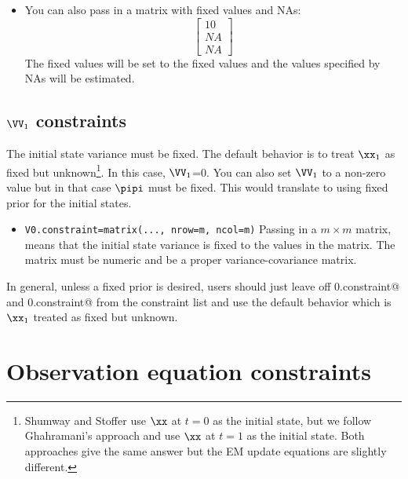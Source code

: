 \begin{itemize}
\item[] You can also pass in a matrix with fixed values and NAs: 
\begin{equation*}
 \left[ \begin{array}{c}
    10 \\
    NA \\
    NA \end{array} \right]
\end{equation*}
The fixed values will be set to the fixed values and the values specified by NAs will be estimated.

\end{itemize}

\subsection{$\VV_1$ constraints}

The initial state variance must be fixed.  The default behavior is to treat $\xx_1$ as fixed but unknown\footnote{Shumway and Stoffer use $\xx$ at $t=0$ as the initial state, but we follow Ghahramani's approach and use $\xx$ at $t=1$ as the initial state. Both approaches give the same answer but the EM update equations are slightly different.}.  In this case, $\VV_1$=0.  You can also set $\VV_1$ to a non-zero value but in that case $\pipi$ must be fixed.  This would translate to using fixed prior for the initial states.
 \begin{itemize}\itemsep5pt
 \item[] \texttt{V0.constraint=matrix(..., nrow=m, ncol=m)}  Passing in a $m \times m$ matrix, means that the initial state variance is fixed to the values in the matrix. The matrix must be numeric and be a proper variance-covariance matrix.
 \end{itemize}
In general, unless a fixed prior is desired, users should just leave off \verb@x0.constraint@ and \verb@V0.constraint@ from the constraint list and use the default behavior which is $\xx_1$ treated as fixed but unknown.

\section{Observation equation constraints}

